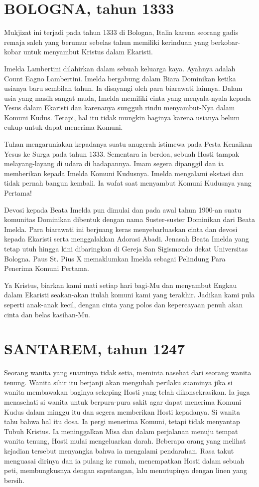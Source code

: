 \section{BOLOGNA, tahun 1333}
Mukjizat ini terjadi pada tahun 1333 di Bologna, Italia karena seorang gadis remaja saleh yang berumur sebelas tahun memiliki kerinduan yang berkobar-kobar untuk menyambut Kristus dalam Ekaristi.

Imelda Lambertini dilahirkan dalam sebuah keluarga kaya. Ayahnya adalah Count Eagno Lambertini. Imelda bergabung dalam Biara Dominikan ketika usianya baru sembilan tahun. Ia disayangi oleh para biarawati lainnya. Dalam usia yang masih sangat muda, Imelda memiliki cinta yang menyala-nyala kepada Yesus dalam Ekaristi dan karenanya sungguh rindu menyambut-Nya dalam Komuni Kudus. Tetapi, hal itu tidak mungkin baginya karena usianya belum cukup untuk dapat menerima Komuni.

Tuhan mengaruniakan kepadanya suatu anugerah istimewa pada Pesta Kenaikan Yesus ke Surga pada tahun 1333. Sementara ia berdoa, sebuah Hosti tampak melayang-layang di udara di hadapannya. Imam segera dipanggil dan ia memberikan kepada Imelda Komuni Kudusnya. Imelda mengalami ekstasi dan tidak pernah bangun kembali. Ia wafat saat menyambut Komuni Kudusnya yang Pertama!

Devosi kepada Beata Imelda pun dimulai dan pada awal tahun 1900-an suatu komunitas Dominikan dibentuk dengan nama Suster-suster Dominikan dari Beata Imelda. Para biarawati ini berjuang keras menyebarluaskan cinta dan devosi kepada Ekaristi serta menggalakkan Adorasi Abadi. Jenasah Beata Imelda yang tetap utuh hingga kini dibaringkan di Gereja San Sigismondo dekat Universitas Bologna. Paus St. Pius X memaklumkan Imelda sebagai Pelindung Para Penerima Komuni Pertama.

Ya Kristus, biarkan kami mati setiap hari bagi-Mu dan menyambut Engkau dalam Ekaristi seakan-akan itulah komuni kami yang terakhir. Jadikan kami pula seperti anak-anak kecil, dengan cinta yang polos dan kepercayaan penuh akan cinta dan belas kasihan-Mu.

\section{SANTAREM, tahun 1247}

Seorang wanita yang suaminya tidak setia, meminta nasehat dari seorang wanita tenung. Wanita sihir itu berjanji akan mengubah perilaku suaminya jika si wanita membawakan baginya sekeping Hosti yang telah dikonsekrasikan. Ia juga menasehati si wanita untuk berpura-pura sakit agar dapat menerima Komuni Kudus dalam minggu itu dan segera memberikan Hosti kepadanya. Si wanita tahu bahwa hal itu dosa. Ia pergi menerima Komuni, tetapi tidak menyantap Tubuh Kristus. Ia meninggalkan Misa dan dalam perjalanan menuju tempat wanita tenung, Hosti mulai mengeluarkan darah. Beberapa orang yang melihat kejadian tersebut menyangka bahwa ia mengalami pendarahan. Rasa takut menguasai dirinya dan ia pulang ke rumah, menempatkan Hosti dalam sebuah peti, membungkusnya dengan saputangan, lalu menutupinya dengan linen yang bersih.

